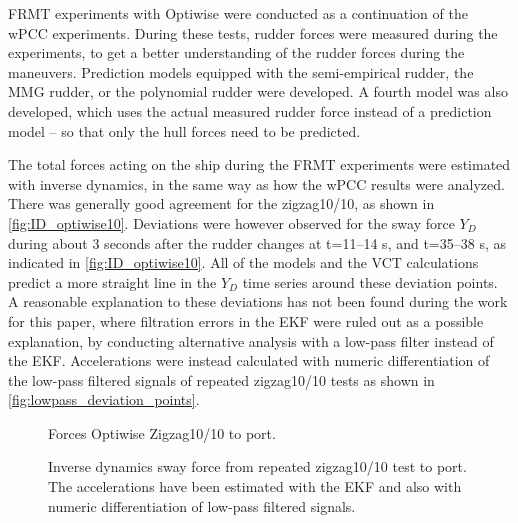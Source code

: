 FRMT experiments with Optiwise were conducted as a continuation of the wPCC experiments. During these tests, rudder forces were measured during the experiments, to get a better understanding of the rudder forces during the maneuvers. Prediction models equipped with the semi-empirical rudder, the MMG rudder, or the polynomial rudder were developed. A fourth model was also developed, which uses the actual measured rudder force instead of a prediction model -- so that only the hull forces need to be predicted. 

The total forces acting on the ship during the FRMT experiments were estimated with inverse dynamics, in the same way as how the wPCC results were analyzed. There was generally good agreement for the zigzag10/10, as shown in \autoref{fig:ID_optiwise10}. Deviations were however observed for the sway force $Y_D$ during about 3 seconds after the rudder changes at t=11--14 s, and t=35--38 s, as indicated in \autoref{fig:ID_optiwise10}. All of the models and the VCT calculations predict a more straight line in the $Y_D$ time series around these deviation points. 
A reasonable explanation to these deviations has not been found during the work for this paper, where filtration errors in the EKF were ruled out as a possible explanation, by conducting alternative analysis with a low-pass filter instead of the EKF. Accelerations were instead calculated with numeric differentiation of the low-pass filtered signals of repeated zigzag10/10 tests as shown in \autoref{fig:lowpass_deviation_points}.
\begin{figure}[h]
     \centering
     
     \caption{Forces Optiwise Zigzag10/10 to port.}
     \label{fig:ID_optiwise10}
\end{figure}
\begin{figure}[h]
    \centering
    
    \caption{Inverse dynamics sway force from repeated zigzag10/10 test to port. The accelerations have been estimated with the EKF and also with numeric differentiation of low-pass filtered signals.}
    \label{fig:lowpass_deviation_points}
\end{figure}

